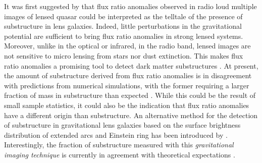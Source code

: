 \documentclass[manuscript]{emulateapj}
\newcommand{\simona}[1]{\textcolor{simonacolor}{#1}}
\begin{document}
\simona{It was first suggested by \citet{Mao1998} that flux ratio anomalies observed in radio loud multiple images of lensed quasar could be interpreted as the telltale of the presence of substructure in lens galaxies.}
\simona{Indeed,} little perturbations in the gravitational potential are sufficient to bring flux ratio anomalies in strong lensed systems. 
\simona{Moreover, unlike in the optical or infrared,} in the radio band, lensed images are not sensitive to micro lensing from stars \simona{nor dust extinction}. 
This makes flux ratio anomalies a promising tool to detect dark matter substructures \citep{Dalal2002, N13}.  
\simona{At present, the amount of substructure derived from flux ratio anomalies is in disagreement with predictions from numerical simulations, with the former requiring a larger fraction of mass in substructure than expected \citet{Xu14}. While this could be the result of small sample statistics, it could also be the indication that flux ratio anomalies have a different origin than substructure.} \simona{An alternative method for the detection of substructure in gravitational lens galaxies based on the surface brightness distribution of extended arcs and Einstein ring has been introduced by \citet{K05,V09}. Interestingly, the fraction of substructure measured with this \emph{gravitational imaging technique} is currently in agreement with theoretical expectations \citep{V14a}.} 
\end{document}
